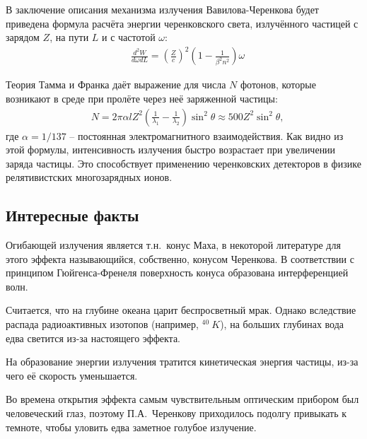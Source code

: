 \begin{Diplom-Main}
	В заключение описания механизма излучения Вавилова-Черенкова будет приведена формула расчёта энергии черенковского света, излучённого частицей с зарядом $ Z $, на пути $ L $ и с частотой $ \omega $:
	\begin{align}
		& \frac{d^2 W}{d \omega dL} = \left(\frac{Z}{c}\right)^2 \left(1 - \frac{1}{\beta^2 n^2}\right) \omega
		\label{intensity}
	\end{align}
	
	Теория Тамма и Франка даёт выражение для числа $N$ фотонов, которые возникают в среде при пролёте через неё заряженной частицы:
	\begin{align}
		& N = 2 \pi \alpha l Z^2 \left(\frac{1}{\lambda_1} - \frac{1}{\lambda_2}\right) \sin^2{\theta}\approx 500 Z^2 \sin^2{\theta},
		\label{restr}
	\end{align}
	где $ \alpha = 1/137$ -- постоянная электромагнитного взаимодействия. 
	Как видно из этой формулы, интенсивность излучения быстро возрастает при увеличении заряда частицы. Это способствует применению черенковских детекторов в физике релятивистских многозарядных ионов. 
	
	\subsection{Интересные факты}
	\label{sec:subsection}
	
	Огибающей излучения является т.н.~конус Маха, в некоторой литературе для этого эффекта называющийся, собственно, конусом Черенкова. В соответствии с принципом Гюйгенса-Френеля поверхность конуса образована интерференцией волн.
	
	Считается, что на глубине океана царит беспросветный мрак. Однако вследствие распада радиоактивных изотопов (например, ${}^{40}~K$), на больших глубинах вода едва светится из-за настоящего эффекта. 
	
	На образование энергии излучения тратится кинетическая энергия частицы, из-за чего её скорость уменьшается. 
	
	Во времена открытия эффекта самым чувствительным оптическим прибором был человеческий глаз, поэтому П.А.~Черенкову приходилось подолгу привыкать к темноте, чтобы уловить едва заметное голубое излучение. 
	

\end{Diplom-Main}
